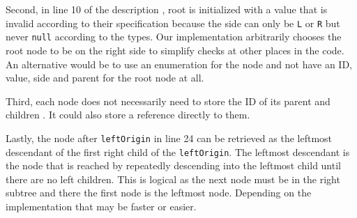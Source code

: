 Second, in line 10 of the description \cite[Algorithm~1]{2023-weidner-minimizing-interleaving}, root is initialized with a value that is invalid according to their specification because the side can only be \texttt{L} or \texttt{R} but never \texttt{null} according to the types. Our implementation arbitrarily chooses the root node to be on the right side to simplify checks at other places in the code. An alternative would be to use an enumeration for the node and not have an ID, value, side and parent for the root node at all.

Third, each node does not necessarily need to store the ID of its parent and children \cite[Algorithm~1]{2023-weidner-minimizing-interleaving}. It could also store a reference directly to them.

Lastly, the node after \texttt{leftOrigin} in line 24 \cite[Algorithm~1]{2023-weidner-minimizing-interleaving} can be retrieved as the leftmost descendant of the first right child of the \texttt{leftOrigin}. The leftmost descendant is the node that is reached by repeatedly descending into the leftmost child until there are no left children. This is logical as the next node must be in the right subtree and there the first node is the leftmost node. Depending on the implementation that may be faster or easier.
